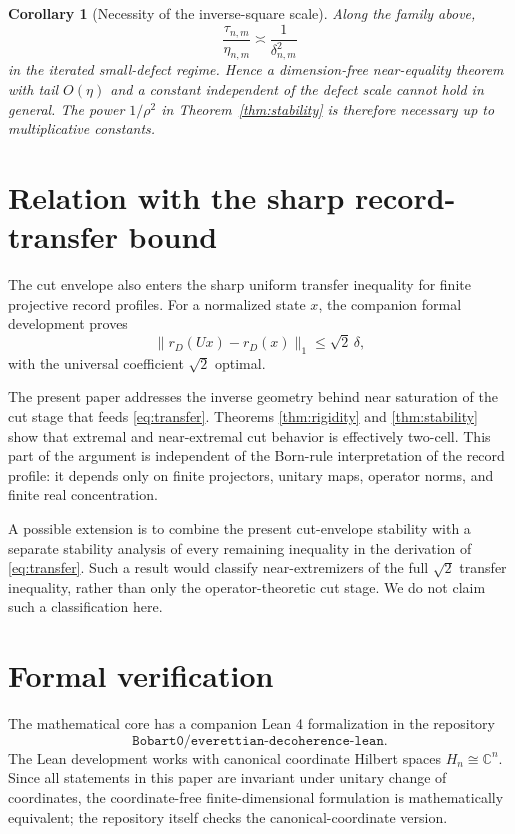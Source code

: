 \documentclass[11pt]{article}
\newtheorem{corollary}[theorem]{Corollary}
\newcommand{\C}{\mathbb{C}}
\newcommand{\dd}{\delta}
\newcommand{\etaq}{\eta}
\newcommand{\tauq}{\tau}
\begin{document}
\begin{corollary}[Necessity of the inverse-square scale]
Along the family above,
\[
  \frac{\tauq_{n,m}}{\etaq_{n,m}}
  \asymp \frac{1}{\dd_{n,m}^2}
\]
in the iterated small-defect regime.  Hence a dimension-free near-equality
theorem with tail $O(\etaq)$ and a constant independent of the defect scale
cannot hold in general.  The power $1/\rho^2$ in
Theorem~\ref{thm:stability} is therefore necessary up to multiplicative
constants.
\end{corollary}

\section{Relation with the sharp record-transfer bound}

The cut envelope also enters the sharp uniform transfer inequality for finite
projective record profiles.  For a normalized state $x$, the companion
formal development proves
\begin{equation}\label{eq:transfer}
  \|r_D(Ux)-r_D(x)\|_1
  \le
  \sqrt2\,\dd,
\end{equation}
with the universal coefficient $\sqrt2$ optimal.

The present paper addresses the inverse geometry behind near saturation of
the cut stage that feeds \eqref{eq:transfer}.  Theorems
\ref{thm:rigidity} and \ref{thm:stability} show that extremal and
near-extremal cut behavior is effectively two-cell.  This part of the
argument is independent of the Born-rule interpretation of the record
profile: it depends only on finite projectors, unitary maps, operator norms,
and finite real concentration.

A possible extension is to combine the present cut-envelope stability with a
separate stability analysis of every remaining inequality in the derivation
of \eqref{eq:transfer}.  Such a result would classify near-extremizers of the
full $\sqrt2$ transfer inequality, rather than only the operator-theoretic cut
stage.  We do not claim such a classification here.

\section{Formal verification}

The mathematical core has a companion Lean 4 formalization in the repository
\[
  \texttt{Bobart0/everettian-decoherence-lean}.
\]
The Lean development works with canonical coordinate Hilbert spaces
$H_n\cong\C^n$.  Since all statements in this paper are invariant under
unitary change of coordinates, the coordinate-free finite-dimensional
formulation is mathematically equivalent; the repository itself checks the
canonical-coordinate version.
\end{document}
